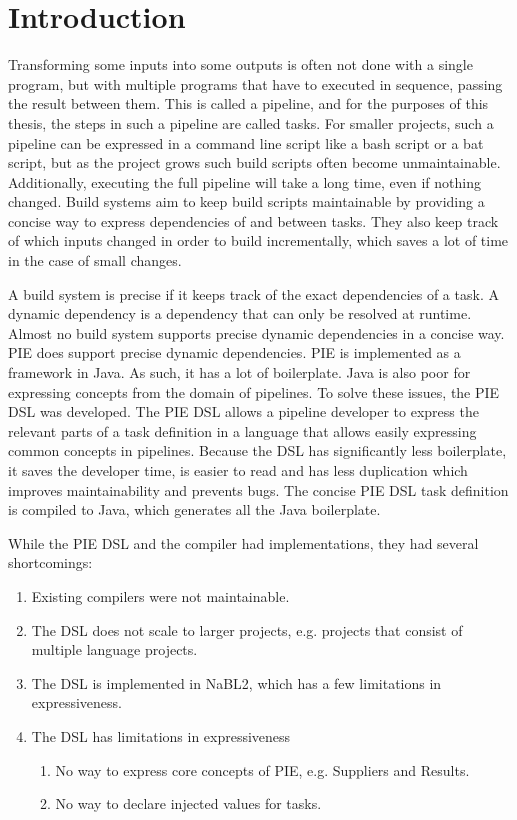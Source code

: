 
\section{Introduction}
\label{sec:introduction}

Transforming some inputs into some outputs is often not done with a single program, but with multiple programs that have to executed in sequence, passing the result between them.
This is called a pipeline, and for the purposes of this thesis, the steps in such a pipeline are called tasks.
For smaller projects, such a pipeline can be expressed in a command line script like a bash script or a bat script, but as the project grows such build scripts often become unmaintainable.
Additionally, executing the full pipeline will take a long time, even if nothing changed.
Build systems aim to keep build scripts maintainable by providing a concise way to express dependencies of and between tasks.
They also keep track of which inputs changed in order to build incrementally, which saves a lot of time in the case of small changes.

A build system is precise if it keeps track of the exact dependencies of a task.
A dynamic dependency is a dependency that can only be resolved at runtime.
Almost no build system supports precise dynamic dependencies in a concise way.
PIE does support precise dynamic dependencies.
PIE is implemented as a framework in Java.
As such, it has a lot of boilerplate.
Java is also poor for expressing concepts from the domain of pipelines.
To solve these issues, the PIE DSL was developed.
The PIE DSL allows a pipeline developer to express the relevant parts of a task definition in a language that allows easily expressing common concepts in pipelines.
Because the DSL has significantly less boilerplate, it saves the developer time, is easier to read and has less duplication which improves maintainability and prevents bugs. 
The concise PIE DSL task definition is compiled to Java, which generates all the Java boilerplate.

While the PIE DSL and the compiler had implementations, they had several shortcomings:
\begin{enumerate}
  \item Existing compilers were not maintainable.
  \item The DSL does not scale to larger projects, e.g. projects that consist of multiple language projects.
  \item The DSL is implemented in NaBL2, which has a few limitations in expressiveness.
  \item The DSL has limitations in expressiveness
  \begin{enumerate}
    \item No way to express core concepts of PIE, e.g. Suppliers and Results.
    \item No way to declare injected values for tasks.
  \end{enumerate}
\end{enumerate}

